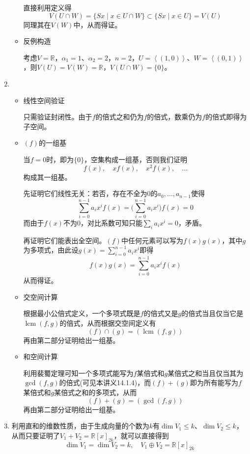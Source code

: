 \documentclass[a4paper,UTF8,fontset=windows,AutoFakeBold]{ctexart}
\DeclareMathOperator{\lcm}{lcm}
\begin{document}
\begin{enumerate}
\begin{itemize}
        直接利用定义得
        $$V(U\cap W)=\{Sx\mid x\in U\cap W\}\subset\{Sx\mid x\in U\}=V(U)$$
        同理其在$V(W)$中，从而得证。

        \item 反例构造
        
        考虑$V=\mathbb{R}$，$\alpha_1=1$、$\alpha_2=2$，$n=2$，$U=\left<(1,0)\right>$、$W=\left<(0,1)\right>$，则$V(U)=V(W)=\mathbb{R}$，$V(U\cap W)=\{0\}$。
    \end{itemize}

    \item 
    \begin{itemize}
        \item 线性空间验证
        
        只需验证封闭性。由于$f$的倍式之和仍为$f$的倍式，数乘仍为$f$的倍式即得为子空间。

        \item $(f)$的一组基
        
        当$f=0$时，即为$\{0\}$，空集构成一组基，否则我们证明
        $$f(x),\quad xf(x),\quad x^2f(x),\quad\dots$$
        构成其一组基。

        先证明它们线性无关：若否，存在不全为0的$a_0,\dots,a_{n-1}$使得
        $$\sum_{i=0}^{n-1}a_ix^if(x)=\bigg(\sum_{i=0}^{n-1}a_ix^i\bigg)f(x)=0$$
        而由于$f(x)$不为0，对比系数可知只能$\sum_ia_ix^i=0$，矛盾。

        再证明它们能表出全空间。$(f)$中任何元素可以写为$f(x)g(x)$，其中$g$为多项式，由此设$g(x)=\sum_{i=0}^{n-1}a_ix^i$即得
        $$f(x)g(x)=\sum_{i=0}^{n-1}a_ix^if(x)$$
        从而得证。

        \item 交空间计算
        
        根据最小公倍式定义，一个多项式既是$f$的倍式又是$g$的倍式当且仅当它是$\lcm(f,g)$的倍式，从而根据交空间定义有
        $$(f)\cap(g)=(\lcm(f,g))$$
        再由第二部分证明给出一组基。

        \item 和空间计算
        
        利用裴蜀定理可知一个多项式能写为$f$某倍式和$g$某倍式之和当且仅当其为$\gcd(f,g)$的倍式(可见本讲义14.1.4)，而$(f)+(g)$即为所有能写为$f$某倍式和$g$某倍式之和的多项式，从而
        $$(f)+(g)=(\gcd(f,g))$$
        再由第二部分证明给出一组基。
    \end{itemize}

    \item
    利用直和的维数性质，由于生成向量的个数为$k$有$\dim V_1\le k$、$\dim V_2\le k$，从而只要证明了$V_1+V_2=\mathbb{R}[x]_{2k}$，就可以直接得到
    $$\dim V_1=\dim V_2=k,\quad V_1\oplus V_2=\mathbb{R}[x]_{2k}$$


\end{enumerate}
\end{document}

